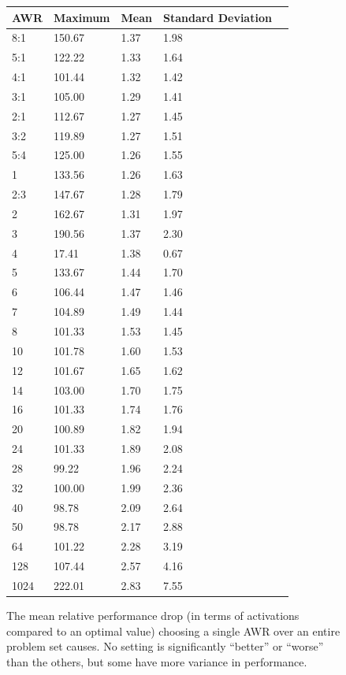 \documentclass{llncs}
\begin{document}
\begin{figure}[t]
	\centering
	\begin{tabular}{l l l l l}
AWR & Maximum & Mean & Standard Deviation\\
\hline
8:1 & 150.67 & 1.37 & 1.98\\
5:1 & 122.22 & 1.33 & 1.64\\
4:1 & 101.44 & 1.32 & 1.42\\
3:1 & 105.00 & 1.29 & 1.41\\
2:1 & 112.67 & 1.27 & 1.45\\
3:2 & 119.89 & 1.27 & 1.51\\
5:4 & 125.00 & 1.26 & 1.55\\
1 & 133.56 & 1.26 & 1.63\\
2:3 & 147.67 & 1.28 & 1.79\\
2 & 162.67 & 1.31 & 1.97\\
3 & 190.56 & 1.37 & 2.30\\
4 & 17.41 & 1.38 & 0.67\\
5 & 133.67 & 1.44 & 1.70\\
6 & 106.44 & 1.47 & 1.46\\
7 & 104.89 & 1.49 & 1.44\\
8 & 101.33 & 1.53 & 1.45\\
10 & 101.78 & 1.60 & 1.53\\
12 & 101.67 & 1.65 & 1.62\\
14 & 103.00 & 1.70 & 1.75\\
16 & 101.33 & 1.74 & 1.76\\
20 & 100.89 & 1.82 & 1.94\\
24 & 101.33 & 1.89 & 2.08\\
28 & 99.22 & 1.96 & 2.24\\
32 & 100.00 & 1.99 & 2.36\\
40 & 98.78 & 2.09 & 2.64\\
50 & 98.78 & 2.17 & 2.88\\
64 & 101.22 & 2.28 & 3.19\\
128 & 107.44 & 2.57 & 4.16\\
1024 & 222.01 & 2.83 & 7.55
	\end{tabular}
	\caption{The mean relative performance drop (in terms of activations compared to an optimal value) choosing a single AWR over an entire problem set causes. No setting is significantly ``better'' or ``worse'' than the others, but some have more variance in performance.}
	\label{fig:no-best-awr}
\end{figure}
\end{document}
